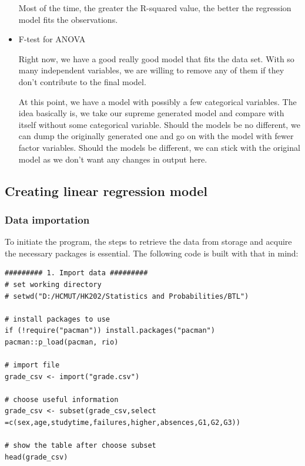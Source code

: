 \documentclass[a4paper]{article}
\numberwithin{equation}{section}
\begin{document}
\begin{itemize}
        Most of the time, the greater the R-squared value, the better the regression model fits the observations.

  \item F-test for ANOVA

        Right now, we have a good really good model that fits the data set.
        With so many independent variables, we are willing to remove any of them if they don't contribute to the final model.

        At this point, we have a model with possibly a few categorical variables.
        The idea basically is, we take our supreme generated model and compare with itself without some categorical variable.
        Should the models be no different, we can dump the originally generated one and go on with the model with fewer factor variables.
        Should the models be different, we can stick with the original model as we don't want any changes in output here.
\end{itemize}

\newpage
\subsection{Creating linear regression model}
\subsubsection{Data importation}
To initiate the program, the steps to retrieve the data from storage and acquire the necessary packages is essential. The following code is built with that in mind:

\begin{mdframed}[leftline=false,rightline=false,backgroundcolor=magenta!10,nobreak=true]
  \begin{verbatim}
######### 1. Import data #########
# set working directory
# setwd("D:/HCMUT/HK202/Statistics and Probabilities/BTL")

# install packages to use
if (!require("pacman")) install.packages("pacman")
pacman::p_load(pacman, rio)

# import file
grade_csv <- import("grade.csv")

# choose useful information
grade_csv <- subset(grade_csv,select =c(sex,age,studytime,failures,higher,absences,G1,G2,G3))

# show the table after choose subset
head(grade_csv)
  \end{verbatim}
\end{mdframed}
\end{document}
